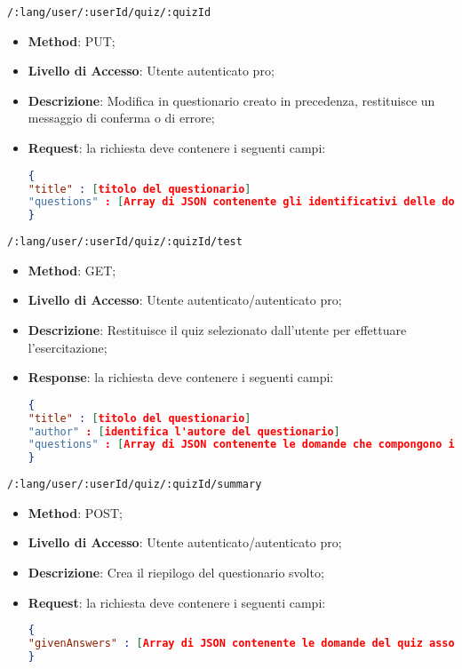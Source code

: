 	\item \texttt{/:lang/user/:userId/quiz/:quizId}
	\begin{itemize}
		\item \textbf{Method}: PUT;
		\item \textbf{Livello di Accesso}: Utente autenticato pro;
		\item \textbf{Descrizione}: Modifica in questionario creato in precedenza, restituisce un messaggio di conferma o di errore;
		\item \textbf{Request}: la richiesta deve contenere i seguenti campi:
\begin{lstlisting}[language=json,firstnumber=1]
{
"title" : [titolo del questionario]
"questions" : [Array di JSON contenente gli identificativi delle domande che compongono il questionario]
}
\end{lstlisting}
	\end{itemize}
	
	\item \texttt{/:lang/user/:userId/quiz/:quizId/test}
	\begin{itemize}
		\item \textbf{Method}: GET;
		\item \textbf{Livello di Accesso}: Utente autenticato/autenticato pro;
		\item \textbf{Descrizione}: Restituisce il quiz selezionato dall'utente per effettuare l'esercitazione;
		\item \textbf{Response}: la richiesta deve contenere i seguenti campi:
\begin{lstlisting}[language=json,firstnumber=1]
{
"title" : [titolo del questionario]
"author" : [identifica l'autore del questionario]
"questions" : [Array di JSON contenente le domande che compongono il questionario]
}
\end{lstlisting}
	\end{itemize}
	
	
	\item \texttt{/:lang/user/:userId/quiz/:quizId/summary}
	\begin{itemize}
		\item \textbf{Method}: POST;
		\item \textbf{Livello di Accesso}: Utente autenticato/autenticato pro;
		\item \textbf{Descrizione}: Crea il riepilogo del questionario svolto;
		\item \textbf{Request}: la richiesta deve contenere i seguenti campi:
\begin{lstlisting}[language=json,firstnumber=1]
{
"givenAnswers" : [Array di JSON contenente le domande del quiz associate alle risposte date dall'utente]
}
\end{lstlisting}
	\end{itemize}